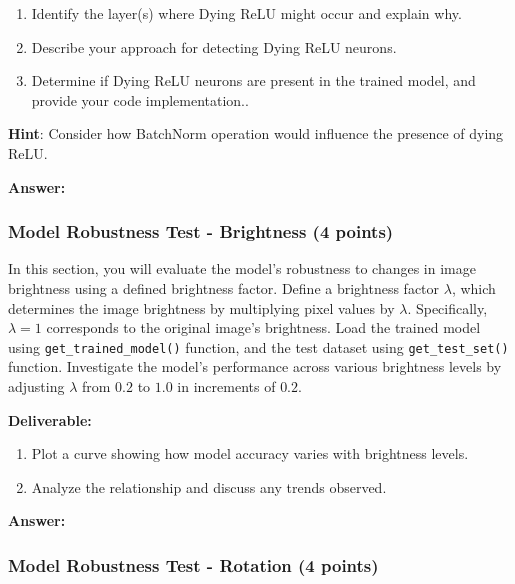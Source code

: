 \documentclass[11pt, oneside]{article}   	%
\begin{document}
\begin{enumerate}
    \item Identify the layer(s) where Dying ReLU might occur and explain why.
    \item Describe your approach for detecting Dying ReLU neurons. 
    \item Determine if Dying ReLU neurons are present in the trained model, and provide your code implementation..
\end{enumerate}
\textbf{Hint}: Consider how BatchNorm operation would influence the presence of dying ReLU.
    
\begin{answerbox} \textbf{Answer:} \vspace*{1cm}

\end{answerbox}

\subsubsection*{Model Robustness Test - Brightness (4 points)}
In this section, you will evaluate the model's robustness to changes in image brightness using a defined brightness factor.
Define a brightness factor $\lambda$, which determines the image brightness by multiplying pixel values by $\lambda$. Specifically, $\lambda = 1$ corresponds to the original image's brightness.
Load the trained model using \texttt{get\_trained\_model()} function, and the test dataset using \texttt{get\_test\_set()} function.  Investigate the model's performance across various brightness levels by adjusting $\lambda$ from $0.2$ to $1.0$ in increments of $0.2$. 

\noindent\textbf{Deliverable:}

\begin{enumerate}
    \item  Plot a curve showing how model accuracy varies with brightness levels.
    \item Analyze the relationship and discuss any trends observed.
\end{enumerate}


\begin{answerbox} \textbf{Answer:} \vspace*{1cm}

\end{answerbox}


\subsubsection*{Model Robustness Test - Rotation (4 points)}
\end{document}
